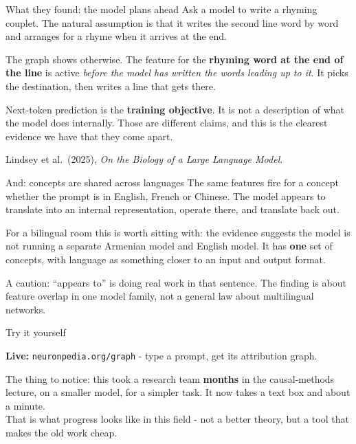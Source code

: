 \documentclass[aspectratio=169]{beamer}
\newcommand{\keybox}[1]{%
  \begin{tcolorbox}[colback=armblue!8, colframe=armblue, boxrule=0.6pt, arc=2pt]
  #1
  \end{tcolorbox}}
\newcommand{\trapbox}[1]{%
  \begin{tcolorbox}[colback=armred!8, colframe=armred, boxrule=0.6pt, arc=2pt]
  #1
  \end{tcolorbox}}
\newcommand{\takebox}[1]{%
  \begin{tcolorbox}[colback=paramgreen!8, colframe=paramgreen, boxrule=0.6pt, arc=2pt]
  #1
  \end{tcolorbox}}
\newcommand{\demobox}[1]{%
  \begin{center}
  \begin{tcolorbox}[colback=violet1!8, colframe=violet1, boxrule=0.7pt, arc=2pt,
                    width=0.9\textwidth]
    \centering\textbf{Live:} #1
  \end{tcolorbox}
  \end{center}}
\begin{document}
\begin{frame}{What they found: the model plans ahead}
  \vspace{0.7em}
  Ask a model to write a rhyming couplet. The natural assumption is that it writes the second
  line word by word and arranges for a rhyme when it arrives at the end.

  \vspace{0.9em}
  \trapbox{The graph shows otherwise. The feature for the \textbf{rhyming word at the end of the
  line} is active \emph{before the model has written the words leading up to it}. It picks the
  destination, then writes a line that gets there.}

  \vspace{0.9em}
  \keybox{Next-token prediction is the \textbf{training objective}. It is not a description of
  what the model does internally. Those are different claims, and this is the clearest evidence
  we have that they come apart.}

  \vspace{0.4em}
  {\footnotesize Lindsey et al.\ (2025), \emph{On the Biology of a Large Language Model}.}
\end{frame}

\begin{frame}{And: concepts are shared across languages}
  \vspace{0.8em}
  The same features fire for a concept whether the prompt is in English, French or Chinese. The
  model appears to translate into an internal representation, operate there, and translate back
  out.

  \vspace{1.0em}
  \keybox{For a bilingual room this is worth sitting with: the evidence suggests the model is not
  running a separate Armenian model and English model. It has \textbf{one} set of concepts, with
  language as something closer to an input and output format.}

  \vspace{0.9em}
  {\footnotesize A caution: ``appears to'' is doing real work in that sentence. The finding is
  about feature overlap in one model family, not a general law about multilingual networks.}
\end{frame}

\begin{frame}{Try it yourself}
  \vspace{1.1em}
  \demobox{\texttt{neuronpedia.org/graph} - type a prompt, get its attribution graph.}

  \vspace{1.1em}
  \takebox{The thing to notice: this took a research team \textbf{months} in the causal-methods lecture, on a
  smaller model, for a simpler task. It now takes a text box and about a minute.\\[0.5em]
  That is what progress looks like in this field - not a better theory, but a tool that makes the
  old work cheap.}
\end{frame}
\end{document}
